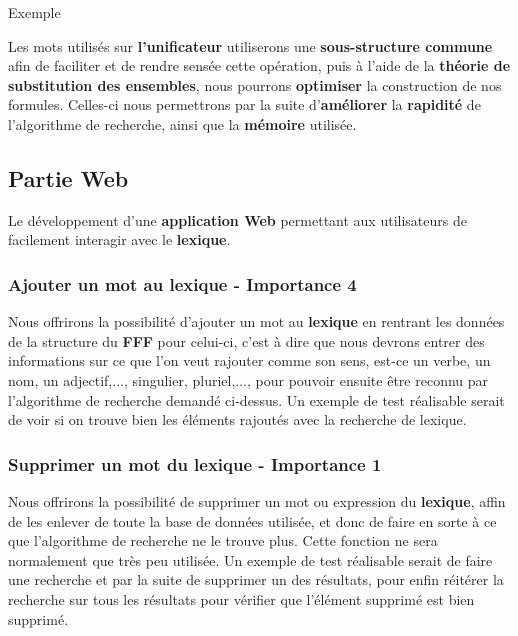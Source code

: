 Exemple
\newline

{Les mots utilisés sur \textbf{l'unificateur} utiliserons une \textbf{sous-structure commune} afin de faciliter et de rendre sensée cette opération, puis à l'aide de la \textbf{théorie de substitution des ensembles}, nous pourrons \textbf{optimiser} la construction de nos formules. Celles-ci nous permettrons par la suite d'\textbf{améliorer} la \textbf{rapidité} de l'algorithme de recherche, ainsi que la \textbf{mémoire} utilisée.\par}

\subsection{Partie Web}
Le développement d'une \textbf{application Web} permettant aux utilisateurs de facilement interagir avec le \textbf{lexique}.

\subsubsection{Ajouter un mot au lexique - Importance 4}

{Nous offrirons la possibilité d'ajouter un mot au \textbf{lexique} en rentrant les données de la structure du \textbf{FFF} pour celui-ci, c'est à dire que nous devrons entrer des informations sur ce que l'on veut rajouter comme son sens, est-ce un verbe, un nom, un adjectif,..., singulier, pluriel,..., pour pouvoir ensuite être reconnu par l'algorithme de recherche demandé ci-dessus. Un exemple de test réalisable serait de voir si on trouve bien les éléments rajoutés avec la recherche de lexique.\par}

\subsubsection{Supprimer un mot du lexique - Importance 1}
{Nous offrirons la possibilité de supprimer un mot ou expression du \textbf{lexique}, affin de les enlever de toute la base de données utilisée, et donc de faire en sorte à ce que l'algorithme de recherche ne le trouve plus. Cette fonction ne sera normalement que très peu utilisée. Un exemple de test réalisable serait de faire une recherche et par la suite de supprimer un des résultats, pour enfin réitérer la recherche sur tous les résultats pour vérifier que l'élément supprimé est bien supprimé.\par}

